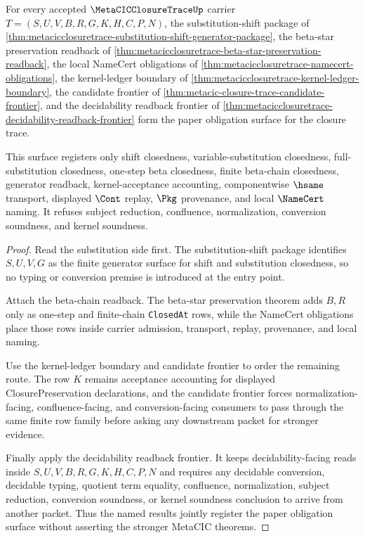 \begin{theorem}
\label{thm:metacicclosuretrace-obligation-status-registration}
For every accepted $\MetaCICClosureTraceUp$ carrier $T=(S,U,V,B,R,G,K,H,C,P,N)$, the substitution-shift package of \autoref{thm:metacicclosuretrace-substitution-shift-generator-package}, the beta-star preservation readback of \autoref{thm:metacicclosuretrace-beta-star-preservation-readback}, the local NameCert obligations of \autoref{thm:metacicclosuretrace-namecert-obligations}, the kernel-ledger boundary of \autoref{thm:metacicclosuretrace-kernel-ledger-boundary}, the candidate frontier of \autoref{thm:metacic-closure-trace-candidate-frontier}, and the decidability readback frontier of \autoref{thm:metacicclosuretrace-decidability-readback-frontier} form the paper obligation surface for the closure trace.

This surface registers only shift closedness, variable-substitution closedness, full-substitution closedness, one-step beta closedness, finite beta-chain closedness, generator readback, kernel-acceptance accounting, componentwise $\hsame$ transport, displayed $\Cont$ replay, $\Pkg$ provenance, and local $\NameCert$ naming. It refuses subject reduction, confluence, normalization, conversion soundness, and kernel soundness.
\end{theorem}
\begin{proof}
Read the substitution side first. The substitution-shift package identifies $S,U,V,G$ as the finite generator surface for shift and substitution closedness, so no typing or conversion premise is introduced at the entry point.

Attach the beta-chain readback. The beta-star preservation theorem adds $B,R$ only as one-step and finite-chain \texttt{ClosedAt} rows, while the NameCert obligations place those rows inside carrier admission, transport, replay, provenance, and local naming.

Use the kernel-ledger boundary and candidate frontier to order the remaining route. The row $K$ remains acceptance accounting for displayed ClosurePreservation declarations, and the candidate frontier forces normalization-facing, confluence-facing, and conversion-facing consumers to pass through the same finite row family before asking any downstream packet for stronger evidence.

Finally apply the decidability readback frontier. It keeps decidability-facing reads inside $S,U,V,B,R,G,K,H,C,P,N$ and requires any decidable conversion, decidable typing, quotient term equality, confluence, normalization, subject reduction, conversion soundness, or kernel soundness conclusion to arrive from another packet. Thus the named results jointly register the paper obligation surface without asserting the stronger MetaCIC theorems.
\end{proof}

